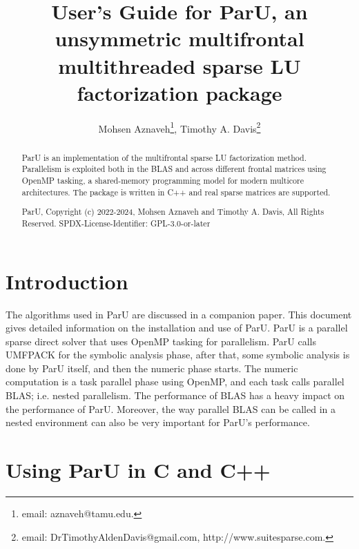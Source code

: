 \documentclass[12pt]{article}
\title{User's Guide for ParU, an unsymmetric multifrontal multithreaded sparse
LU factorization package}
\author{Mohsen Aznaveh\thanks{email: aznaveh@tamu.edu.},
Timothy A. Davis\thanks{email: DrTimothyAldenDavis@gmail.com,
http://www.suitesparse.com.}}
\begin{document}
\maketitle

\begin{abstract}

ParU is an implementation of the multifrontal sparse LU factorization
method.  Parallelism is exploited both in the BLAS and across different frontal
matrices using OpenMP tasking, a shared-memory programming model for modern
multicore architectures. The package is written in C++ and real sparse matrices
are supported.

ParU, Copyright (c) 2022-2024, Mohsen Aznaveh and Timothy A. Davis,
All Rights Reserved.
SPDX-License-Identifier: GPL-3.0-or-later
\end{abstract}

\newpage
{\small
\tableofcontents
}

\section{Introduction}
\label{intro}

The algorithms used in ParU are discussed in a companion paper.
This document gives detailed information on the installation and use of ParU.
ParU is a parallel sparse direct solver that uses OpenMP tasking for
parallelism. ParU calls UMFPACK for the symbolic analysis phase, after that,
some symbolic analysis is done by ParU itself, and then the numeric phase
starts. The numeric computation is a task parallel phase using OpenMP, and each
task calls parallel BLAS; i.e. nested parallelism.  The performance of BLAS has
a heavy impact on the performance of ParU. Moreover, the way parallel BLAS can
be called in a nested environment can also be very important for ParU's
performance.

\section{Using ParU in C and C++}
\end{document}
